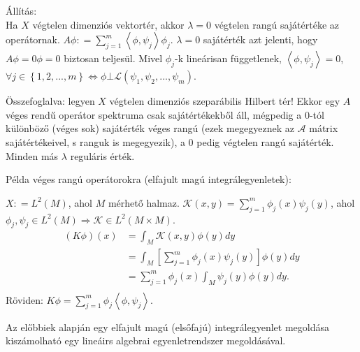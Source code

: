 \documentclass[12pt,a4paper]{scrartcl}
\newenvironment{allitas}{}{}
\newenvironment{pelda}{}{}
\begin{document}
\begin{allitas}

Állítás:\\
Ha \(X\) végtelen dimenziós vektortér, akkor \(\lambda = 0\) végtelen
rangú sajátértéke az operátornak.
\(A\phi: = {\sum\limits_{j = 1}^{m}{\left\langle {\phi,\psi_{j}} \right\rangle\phi_{j}}}\).
\(\lambda = 0\) sajátérték azt jelenti, hogy \(A\phi = 0\phi = 0\)
biztosan teljesül. Mivel \(\phi_{j}\)-k lineárisan függetlenek,
\(\left\langle {\phi,\psi_{j}} \right\rangle = 0\),
\(\left. \forall j \in \left\{ {1,2,...,m} \right\}\Leftrightarrow\phi\bot\mathcal{L}\left( {\psi_{1},\psi_{2},...,\psi_{m}} \right) \right.\).

\end{allitas}

Összefoglalva: legyen \(X\) végtelen dimenziós szeparábilis Hilbert tér!
Ekkor egy \(A\) véges rendű operátor spektruma csak sajátértékekből áll,
mégpedig a 0-tól különböző (véges sok) sajátérték véges rangú (ezek
megegyeznek az \(\mathcal{A}\) mátrix sajátértékeivel, s ranguk is
megegyezik), a 0 pedig végtelen rangú sajátérték. Minden más \(\lambda\)
reguláris érték.

\begin{pelda}

Példa véges rangú operátorokra (elfajult magú integrálegyenletek):

\(X: = L^{2}\left( M \right)\), ahol \(M\) mérhető halmaz.
\(\mathcal{K}\left( {x,y} \right) = {\sum\limits_{j = 1}^{m}{\phi_{j}\left( x \right)\psi_{j}\left( y \right)}}\),
ahol
\(\left. \phi_{j},\psi_{j} \in L^{2}\left( M \right)\Rightarrow\mathcal{K} \in L^{2}\left( {M \times M} \right) \right.\).
\[\begin{aligned}
  \left( {K\phi } \right)\left( x \right) &  = \int_M {{\mathcal{K}}\left( {x,y} \right)\phi \left( y \right)dy}  \\ 
   &  = \int_M {\left[ {\mathop \sum \limits_{j = 1}^m {\phi _j}\left( x \right){\psi _j}\left( y \right)} \right]\phi \left( y \right)dy}  \\ 
   &  = \mathop \sum \limits_{j = 1}^m {\phi _j}\left( x \right)\int_M {{\psi _j}\left( y \right)\phi \left( y \right)dy} . \\ 
\end{aligned} \] Röviden:
\(K\phi = {\sum\limits_{j = 1}^{m}{\phi_{j}\left\langle {\phi,\psi_{j}} \right\rangle}}\).

\end{pelda}

Az előbbiek alapján egy elfajult magú (elsőfajú) integrálegyenlet
megoldása kiszámolható egy lineáirs algebrai egyenletrendszer
megoldásával.
\end{document}
